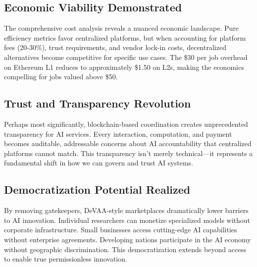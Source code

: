 \subsection{Economic Viability Demonstrated}
The comprehensive cost analysis reveals a nuanced economic landscape. Pure efficiency metrics favor centralized platforms, but when accounting for platform fees (20-30\%), trust requirements, and vendor lock-in costs, decentralized alternatives become competitive for specific use cases. The \$30 per job overhead on Ethereum L1 reduces to approximately \$1.50 on L2s, making the economics compelling for jobs valued above \$50.

\subsection{Trust and Transparency Revolution}
Perhaps most significantly, blockchain-based coordination creates unprecedented transparency for AI services. Every interaction, computation, and payment becomes auditable, addressable concerns about AI accountability that centralized platforms cannot match. This transparency isn't merely technical—it represents a fundamental shift in how we can govern and trust AI systems.

\subsection{Democratization Potential Realized}
By removing gatekeepers, DeVAA-style marketplaces dramatically lower barriers to AI innovation. Individual researchers can monetize specialized models without corporate infrastructure. Small businesses access cutting-edge AI capabilities without enterprise agreements. Developing nations participate in the AI economy without geographic discrimination. This democratization extends beyond access to enable true permissionless innovation.
